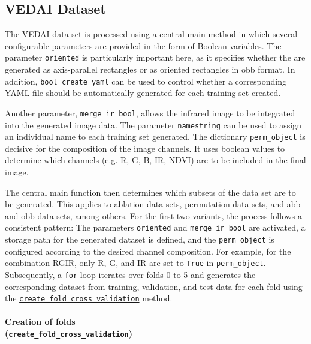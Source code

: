 \subsection{VEDAI Dataset}
\label{subsec:impl_VEDAI}


The \acrshort{VEDAI} data set is processed using a central main method in which several configurable parameters are provided in the form of Boolean variables. The parameter \lstinline|oriented| is particularly important here, as it specifies whether the  are generated as axis-parallel rectangles or as oriented rectangles in \acrshort{obb} format. In addition, \lstinline|bool_create_yaml| can be used to control whether a corresponding \acrshort{YAML} file should be automatically generated for each training set created.

Another parameter, \lstinline|merge_ir_bool|, allows the infrared image to be integrated into the generated image data. The parameter \lstinline|namestring| can be used to assign an individual name to each training set generated. The dictionary \lstinline|perm_object| is decisive for the composition of the image channels. It uses boolean values to determine which channels (e.g. \acrshort{R}, \acrshort{G}, \acrshort{B}, \acrshort{IR}, \acrshort{NDVI}) are to be included in the final image.

The central main function then determines which subsets of the data set are to be generated. This applies to ablation data sets, permutation data sets, and \acrshort{abb} and \acrshort{obb} data sets, among others. For the first two variants, the process follows a consistent pattern: The parameters \lstinline|oriented| and \lstinline|merge_ir_bool| are activated, a storage path for the generated dataset is defined, and the \lstinline|perm_object| is configured according to the desired channel composition. For example, for the combination \acrshort{RGIR}, only \acrshort{R}, \acrshort{G}, and \acrshort{IR} are set to \lstinline|True| in \lstinline|perm_object|. Subsequently, a \texttt{for} loop iterates over folds 0 to 5 and generates the corresponding dataset from training, validation, and test data for each fold using the \hyperlink{par:create_fold_cv}{\lstinline|create_fold_cross_validation|} method.

\paragraph{Creation of folds \\ (\lstinline|create_fold_cross_validation|)}
\hypertarget{par:create_fold_cv}{}

